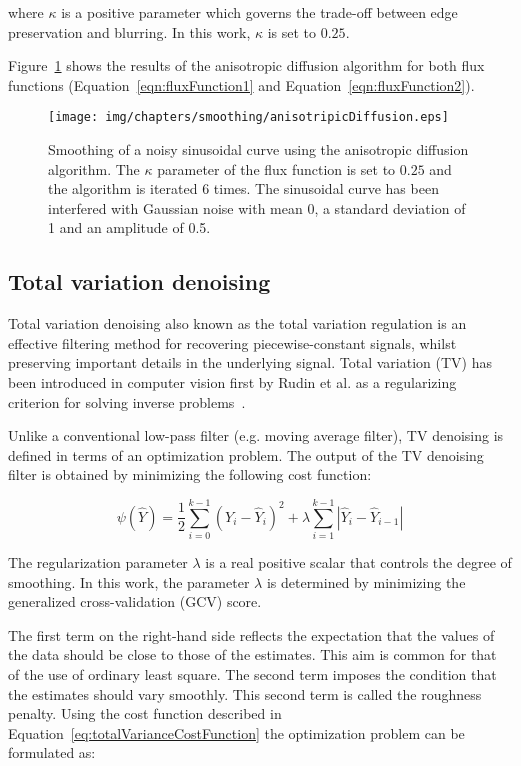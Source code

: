 where $\kappa$ is a positive parameter which governs the trade-off between edge preservation and blurring. In this work, $\kappa$ is set to $0.25$.

Figure~\ref{fig:anisotropicDiffusion} shows the results of the anisotropic diffusion algorithm for both flux functions (Equation~\ref{eqn:fluxFunction1} and Equation~\ref{eqn:fluxFunction2}).

\begin{figure}[htb]
   \centering   
   \texttt{[image: img/chapters/smoothing/anisotripicDiffusion.eps]}
   \caption[Anisotropic diffusion smoothing]{Smoothing of a noisy sinusoidal curve using the anisotropic diffusion algorithm. The $\kappa$ parameter of the flux function is set to $0.25$ and the algorithm is iterated 6 times. The sinusoidal curve has been interfered with Gaussian noise with mean 0, a standard deviation of 1 and an amplitude of 0.5.}
   \label{fig:anisotropicDiffusion}
\end{figure} 

\subsection{Total variation denoising}\label{subsec:totalVariationDenoising}
Total variation denoising also known as the total variation regulation is an effective filtering method for recovering piecewise-constant signals, whilst preserving important details in the underlying signal. Total variation (TV) has been introduced in computer vision first by Rudin et al. as a regularizing criterion for solving inverse problems~\cite{Rudin1992}. 

Unlike a conventional low-pass filter (e.g. moving average filter), TV denoising is defined in terms of an optimization problem. The output of the TV denoising filter is obtained by minimizing the following cost function:

\begin{equation}
	\psi(\hat{Y}) = \frac{1}{2}\sum_{i=0}^{k-1}{(Y_{i}-\hat{Y}_{i})^2+\lambda \sum_{i=1}^{k-1}{|\hat{Y}_{i}-\hat{Y}_{i-1}|}}
\label{eq:totalVarianceCostFunction}
\end{equation}

The regularization parameter $\lambda$ is a real positive scalar that controls the degree of smoothing. In this work, the parameter $\lambda$ is determined by minimizing the generalized cross-validation (GCV) score.

The first term on the right-hand side reflects the expectation that the values of the data should be close to those of the estimates. This aim is common for that of the use of ordinary least square. The second term imposes the condition that the estimates should vary smoothly. This second term is called the roughness penalty. Using the cost function described in Equation~\ref{eq:totalVarianceCostFunction} the optimization problem can be formulated as:

